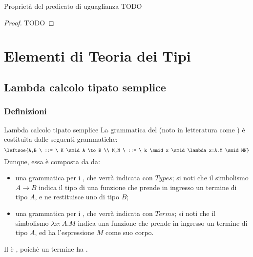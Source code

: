 \documentclass[a4paper, 12pt]{report}
\begin{document}
    \begin{framedprop}{Proprietà del predicato di uguaglianza}
        TODO
    \end{framedprop}

    \begin{proof}
        TODO
    \end{proof}

    \chapter{Elementi di Teoria dei Tipi}

    \section{Lambda calcolo tipato semplice}

    \subsection{Definizioni}

    \begin{frameddefn}{Lambda calcolo tipato semplice}
        La grammatica del  (noto in letteratura come ) è costituita dalle seguenti grammatiche: $$\leftsoe{A,B \ ::= \ K \smid A \to B \\ M,N \ ::= \ k \smid x \smid \lambda x:A.M \smid MN}$$ Dunque, essa è composta da da:

        \begin{itemize}
            \item una grammatica per i , che verrà indicata con $Types$; si noti che il simbolismo $A \to B$ indica il tipo di una funzione che prende in ingresso un termine di tipo $A$, e ne restituisce uno di tipo $B$;
            \item una grammatica per i , che verrà indicata con $Terms$; si noti che il simbolismo $\lambda x: A.M$ indica una funzione che prende in ingresso un termine di tipo $A$, ed ha l'espressione $M$ come suo corpo.
        \end{itemize}

        Il  è , poiché un termine ha .
    \end{frameddefn}
\end{document}
